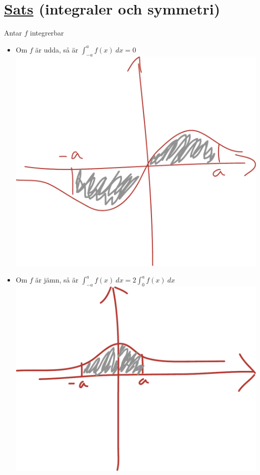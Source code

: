 \documentclass{article}
\begin{document}
\section{\uline{Sats} (integraler och symmetri)}
Antar $f$ integrerbar

\begin{itemize}
  \item Om $f$ är udda, så är $\int_{-a}^a{f(x)\ dx}=0$\\
    \includegraphics[scale=0.25]{img/img1.pdf}
  \item Om $f$ är jämn, så är $\int_{-a}^a{f(x)\ dx}=2\int_0^a{f(x)\ dx}$\\
    \includegraphics[scale=0.25]{img/img2.pdf}

\end{itemize}
\end{document}
